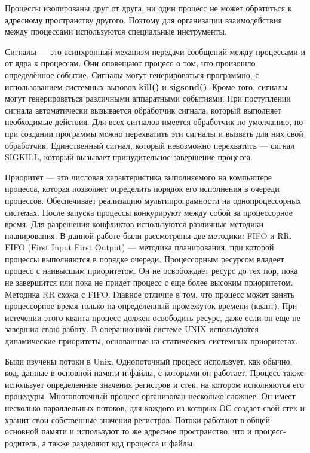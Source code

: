 \documentclass[a4paper]{article}
\begin{document}
	Процессы изолированы друг от друга, ни один процесс не может обратиться к адресному пространству другого. Поэтому для организации взаимодействия между процессами используются специальные инструменты.
	
	Сигналы — это асинхронный механизм передачи сообщений между процессами и от ядра к процессам. Они оповещают процесс о том, что произошло определённое событие. Сигналы могут генерироваться программно, с использованием системных вызовов \textbf{kill()} и \textbf{sigsend()}. Кроме того, сигналы могут генерироваться различными аппаратными событиями.  При поступлении сигнала автоматически вызывается обработчик сигнала, который выполняет необходимые действия. Для всех сигналов имеется обработчик по умолчанию, но при создании программы можно перехватить эти сигналы и вызвать для них свой обработчик. Единственный сигнал, который невозможно перехватить --- сигнал SIGKILL, который вызывает принудительное завершение процесса.
	
	 Приоритет --- это числовая характеристика выполняемого на компьютере процесса, которая позволяет определить порядок его исполнения в очереди процессов. Обеспечивает реализацию мультипрограмности на однопроцессорных системах. После запуска процессы конкурируют между собой за процессорное время. Для разрешения конфликтов используются различные методики планирования. В данной работе были рассмотрены две методики: FIFO и RR. FIFO (First Input First Output) --- методика планирования, при которой процессы выполняются в порядке очереди. Процессорным ресурсом владеет процесс с наивысшим приоритетом. Он не освобождает ресурс до тех пор, пока не завершится или пока не придет процесс с еще более высоким приоритетом. Методика RR схожа с FIFO. Главное отличие в том, что процесс может занять процессорное время только на определенный промежуток времени (квант). При истечении этого кванта процесс должен освободить ресурс, даже если он еще не завершил свою работу. В операционной системе UNIX используются динамические приоритеты, основанные на статических системных приоритетах. 
	 	
	Были изучены потоки в Unix. Однопоточный процесс использует, как обычно, код, данные в основной памяти и файлы, с которыми он работает. Процесс также использует определенные значения регистров и стек, на котором исполняются его процедуры. Многопоточный процесс организован несколько сложнее. Он имеет несколько параллельных потоков, для каждого из которых ОС создает свой стек и хранит свои собственные значения регистров. Потоки работают в общей основной памяти и используют то же адресное пространство, что и процесс-родитель, а также разделяют код процесса и файлы. 
\end{document}
